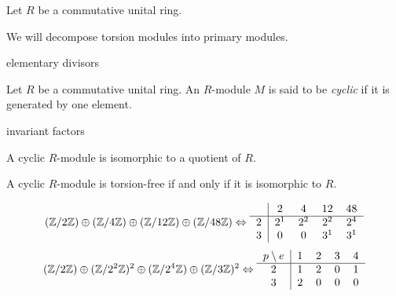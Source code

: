 \documentclass{../../large}
\begin{document}
\begin{prb}
Let $R$ be a commutative unital ring.

We will decompose torsion modules into primary modules.

elementary divisors
\end{prb}


\begin{prb}
Let $R$ be a commutative unital ring.
An $R$-module $M$ is said to be \emph{cyclic} if it is generated by one element.

invariant factors
\begin{parts}
\item A cyclic $R$-module is isomorphic to a quotient of $R$.
\item A cyclic $R$-module is torsion-free if and only if it is isomorphic to $R$.
\end{parts}
\end{prb}
\[
(\Z/2\Z)\oplus(\Z/4\Z)\oplus(\Z/12\Z)\oplus(\Z/48\Z)
\Leftrightarrow
\begin{tabular}{c|cccc}
& 2 & 4 & 12 & 48 \\\hline
2 & $2^1$ & $2^2$ & $2^2$ & $2^4$ \\
3 & 0 & 0 & $3^1$ & $3^1$
\end{tabular}
\]
\[
(\Z/2\Z)\oplus(\Z/2^2\Z)^2\oplus(\Z/2^4\Z)\oplus(\Z/3\Z)^2
\Leftrightarrow
\begin{tabular}{c|cccc}
$p\setminus e$ & 1 & 2 & 3 & 4 \\\hline
2 & 1 & 2 & 0 & 1 \\
3 & 2 & 0 & 0 & 0
\end{tabular}
\]
\end{document}
